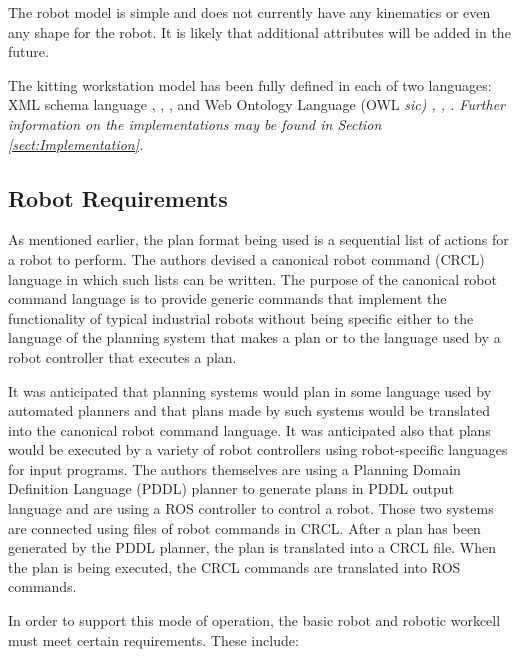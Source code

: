 The robot model is simple and does not currently have any kinematics or
even any shape for the robot. It is likely that additional attributes will
be added in the future.

The kitting workstation model has been fully defined in each of two
languages: XML schema language \cite{Walmsley.2002},
\cite{XMLschemaPrimer}, \cite{XMLschemaStructures}, and Web Ontology
Language (OWL \it sic\rm) \cite{OWLoverview}, \cite{OWLprimer},
\cite{OWLspec}. Further information on the implementations may be
found in Section \ref{sect:Implementation}. 

\subsection{Robot Requirements}
As mentioned earlier, the plan format being used is a sequential list of
actions for a robot to perform. The authors devised a canonical robot
command (CRCL) language in which such lists can be written. The purpose of the
canonical robot command language is to provide generic commands that
implement the functionality of typical industrial robots without being
specific either to the language of the planning system that makes a plan or
to the language used by a robot controller that executes a plan.

It was anticipated that planning systems would plan in some language used
by automated planners and that plans made by such systems would be
translated into the canonical robot command language. It was anticipated
also that plans would be executed by a variety of robot controllers using
robot-specific languages for input programs. The authors themselves are
using a Planning Domain Definition Language (PDDL)
 planner \cite{PDDL} to generate plans in PDDL output language
and are using a ROS controller \cite{ROS} to control a robot. Those two
systems are connected using files of robot commands in CRCL. After a plan
has been generated by the PDDL planner, the plan is translated into a CRCL
file. When the plan is being executed, the CRCL commands are translated
into ROS commands.

In order to support this mode of operation, the basic robot and robotic
workcell must meet certain requirements. These include:

